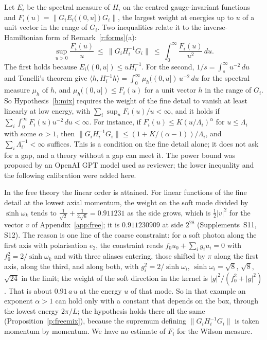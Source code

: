 \begin{remark}\label{r:weight}
Let $E_i$ be the spectral measure of $H_i$ on the centred gauge-invariant functions and
$F_i(u)=\|G_iE_i((0,u])G_i\|$, the largest weight at energies up to $u$ of a unit vector in the range of
$G_i$. Two inequalities relate it to the inverse-Hamiltonian form of Remark~\ref{r:forms}(a):
\[
\sup_{u>0}\frac{F_i(u)}u\ \le\ \big\|G_iH_i^{-1}G_i\big\|\ \le\ \int_0^\infty\frac{F_i(u)}{u^2}\,du .
\]
The first holds because $E_i((0,u])\le uH_i^{-1}$. For the second, $1/s=\int_s^\infty u^{-2}\,du$ and
Tonelli's theorem give $\langle h,H_i^{-1}h\rangle=\int_0^\infty\mu_h((0,u])\,u^{-2}\,du$ for the spectral
measure $\mu_h$ of $h$, and $\mu_h((0,u])\le F_i(u)$ for a unit vector $h$ in the range of $G_i$. So
Hypothesis~\ref{h:mix} requires the weight of the fine detail to vanish at least linearly at low energy,
with $\sum_i\sup_uF_i(u)/u<\infty$, and it holds if $\sum_i\int_0^\infty F_i(u)u^{-2}\,du<\infty$. For
instance, if $F_i(u)\le K(u/\Lambda_i)^\alpha$ for $u\le\Lambda_i$ with some $\alpha>1$, then
$\|G_iH_i^{-1}G_i\|\le(1+K/(\alpha-1))/\Lambda_i$, and $\sum_i\Lambda_i^{-1}<\infty$ suffices. This is a
condition on the fine detail alone; it does not ask for a gap, and a theory without a gap can meet it. The
power bound was proposed by an OpenAI GPT model used as reviewer; the lower inequality and the following
calibration were added here.

In the free theory the linear order is attained. For linear functions of the fine detail at the lowest
axial momentum, the weight on the soft mode divided by $\sinh\omega_k$ tends to
$\tfrac1{\sqrt2}+\tfrac1{2\sqrt6}=0.911231$ as the side grows, which is $\tfrac12|v|^2$ for the vector $v$ of
Appendix~\ref{app:free}; it is $0.911230909$ at side $2^{28}$ (Supplements~S11, S12). The reason is one line
of the coarse constraint: for a soft photon along the first axis with polarisation $e_2$, the constraint
reads $f_0u_0+\sum_ig_iu_i=0$ with $f_0^2=2/\sinh\omega_k$ and with three aliases entering, those shifted by
$\pi$ along the first axis, along the third, and along both, with $g_i^2=2/\sinh\omega_i$, $\sinh\omega_i=\sqrt8$,
$\sqrt8$, $\sqrt{24}$ in the limit; the weight of the soft direction in the kernel is
$|g|^2/(f_0^2+|g|^2)$. That is about $0.91\,a\,u$ at the energy $u$ of that mode. So in that
example an exponent $\alpha>1$ can hold only with a constant that depends on the box, through the lowest
energy $2\pi/L$; the hypothesis holds there all the same (Proposition~\ref{p:freemix}), because the supremum
defining $\|G_iH_i^{-1}G_i\|$ is taken momentum by momentum. We have no estimate of $F_i$ for the Wilson
measure.
\end{remark}

